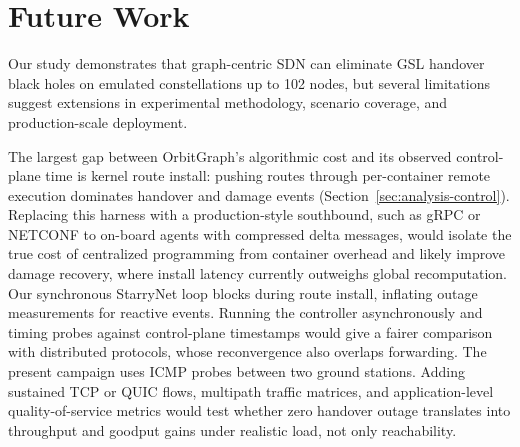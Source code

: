 
\section{Future Work}
\label{sec:future}

Our study demonstrates that graph-centric SDN can eliminate GSL handover black
holes on emulated constellations up to 102 nodes, but several limitations
suggest extensions in experimental methodology, scenario coverage, and
production-scale deployment.

The largest gap between OrbitGraph's algorithmic cost and its observed
control-plane time is kernel route install: pushing routes through per-container
remote execution dominates handover and damage events
(Section~\ref{sec:analysis-control}).
Replacing this harness with a production-style southbound, such as gRPC or
NETCONF to on-board agents with compressed delta messages, would isolate the
true cost of centralized programming from container overhead and likely improve
damage recovery, where install latency currently outweighs global recomputation.
Our synchronous StarryNet loop blocks during route install, inflating outage
measurements for reactive events. Running the controller asynchronously and
timing probes against control-plane timestamps would give a fairer comparison
with distributed protocols, whose reconvergence also overlaps forwarding.
The present campaign uses ICMP probes between two ground stations. Adding
sustained TCP or QUIC flows, multipath traffic matrices, and application-level
quality-of-service metrics would test whether zero handover outage translates
into throughput and goodput gains under realistic load, not only reachability.

